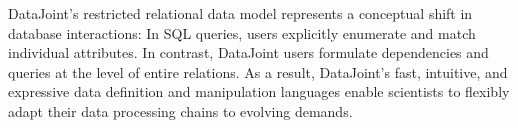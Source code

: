 DataJoint's restricted relational data model represents a conceptual shift in database interactions: In SQL queries, users explicitly enumerate and match individual attributes.
In contrast, DataJoint users formulate dependencies and queries at the level of entire relations.
As a result, DataJoint's fast, intuitive, and expressive data definition and manipulation languages enable scientists to flexibly adapt their data processing chains to evolving demands.
